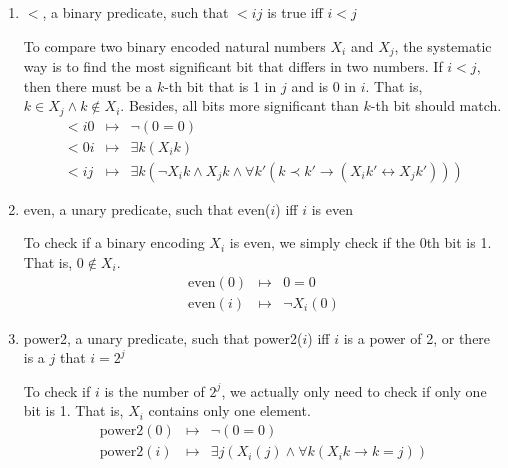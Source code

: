 \documentclass[11pt]{homework}
\begin{document}
\begin{enumerate}
    \item \(<\), a binary predicate, such that \(< ij\) is true iff \(i < j\)

      To compare two binary encoded natural numbers \(X_i\) and \(X_j\),
      the systematic way is to find the most significant bit that differs in two numbers.
      If \(i < j\), then there must be a \(k\)-th bit that is 1 in \(j\) and is 0 in \(i\).
      That is, \(k \in X_j \land k \not\in X_i\).
      Besides, all bits more significant than \(k\)-th bit should match.
\[
\begin{array}{rcl}
	< i0 & \mapsto & \neg (0 = 0) \\
	< 0i & \mapsto & \exists k(X_i k)                                                                                            \\
	< ij & \mapsto & \exists k(\neg X_i k \land X_j k \land 
    \forall k'(k \prec k' \to (X_i k' \leftrightarrow X_j k')) )
\end{array}
\]

    \item even, a unary predicate, such that even(\(i\)) iff \(i\) is even
      
      To check if a binary encoding \(X_i\) is even,
      we simply check if the 0th bit is 1. That is, \(0 \not\in X_i\).
\[
\begin{array}{rcl}
	\text{even}(0) & \mapsto & 0 = 0       \\
	\text{even}(i) & \mapsto & \neg X_i(0)
\end{array}
\]

    \item power2, a unary predicate,
    such that power2(\(i\)) iff \(i\) is a power of 2,
    or there is a \(j\) that \(i = 2^j\)
    
      To check if \(i\) is the number of \(2^j\),
      we actually only need to check if only one bit is 1.
      That is, \(X_i\) contains only one element.
\[
\begin{array}{rcl}
	\text{power2}(0) & \mapsto & \neg(0 = 0) \\
	\text{power2}(i) & \mapsto & \exists j( X_i(j) \land \forall k(X_i k \to k=j))
\end{array}
\]

\end{enumerate}
\end{document}
